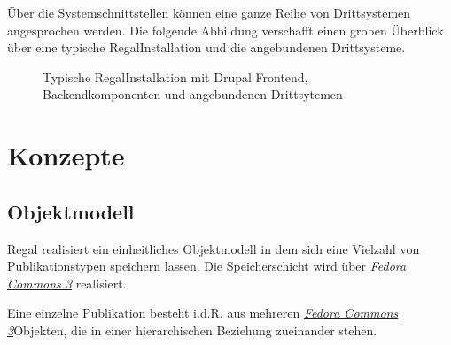 \documentclass[letterpaper,10pt,english]{sphinxmanual}
\begin{document}
\sphinxAtStartPar
Über die Systemschnittstellen können eine ganze Reihe von Drittsystemen
angesprochen werden. Die folgende Abbildung verschafft einen groben
Überblick über eine typische Regal\sphinxhyphen{}Installation und die angebundenen
Drittsysteme.

\begin{figure}[htbp]
\centering
\capstart

\noindent{}
\caption{Typische Regal\sphinxhyphen{}Installation mit Drupal Frontend, Backendkomponenten und angebundenen Drittsytemen}\label{\detokenize{toscience:id84}}\end{figure}


\chapter{Konzepte}
\label{\detokenize{toscience:konzepte}}\label{\detokenize{toscience:id2}}

\section{Objektmodell}
\label{\detokenize{toscience:objektmodell}}\label{\detokenize{toscience:id3}}
\sphinxAtStartPar
Regal realisiert ein einheitliches Objektmodell in dem sich eine
Vielzahl von Publikationstypen speichern lassen. Die Speicherschicht
wird über {\hyperref[\detokenize{toscience:_fedora_commons_3}]{\emph{Fedora Commons 3}}} realisiert.

\sphinxAtStartPar
Eine einzelne Publikation besteht i.d.R. aus mehreren {\hyperref[\detokenize{toscience:_fedora_commons_3}]{\emph{Fedora Commons
3}}}\sphinxhyphen{}Objekten, die in einer hierarchischen
Beziehung zueinander stehen.
\end{document}

